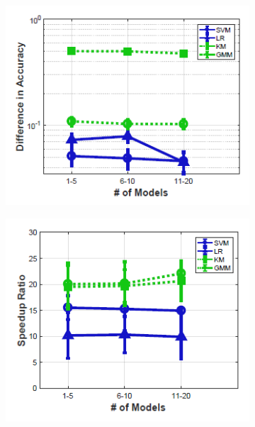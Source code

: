 \begin{figure}[h]
\begin{subfigure}{0.22\textwidth}
        \includegraphics[height = 1.2\textwidth, width=1.2\textwidth]{Figures/model_reuse_coreset_accuracy.png}
    \caption{}
    \label{fig:linview_matrix_powers2}
    \end{subfigure}
    \hfill
    \begin{subfigure}{0.22\textwidth}
        \includegraphics[height = 1.2\textwidth, width=1.2\textwidth]{Figures/model_reuse_coreset_speed_up.png}

\end{subfigure}
\end{figure}
